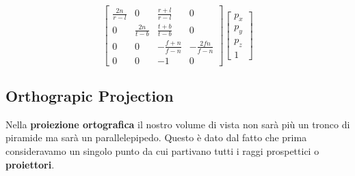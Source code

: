 \[
	\begin{bmatrix}
		\frac{2n}{r - l} & 0                & \frac{r + l}{r - l}  & 0                  \\
		0                & \frac{2n}{t - b} & \frac{t + b}{t - b}  & 0                  \\
		0                & 0                & -\frac{f + n}{f - n} & -\frac{2fn}{f - n} \\
		0                & 0                & -1                   & 0
	\end{bmatrix}
	\begin{bmatrix}
		p_x \\ p_y \\ p_z \\ 1
	\end{bmatrix}
\]

\subsection{Orthograpic Projection}
Nella \textbf{proiezione ortografica} il nostro volume di vista non sar\`a pi\`u un tronco di piramide ma sar\`a un
parallelepipedo. Questo \`e dato dal fatto che prima consideravamo un singolo punto da cui partivano tutti i raggi
prospettici o \textbf{proiettori}.

